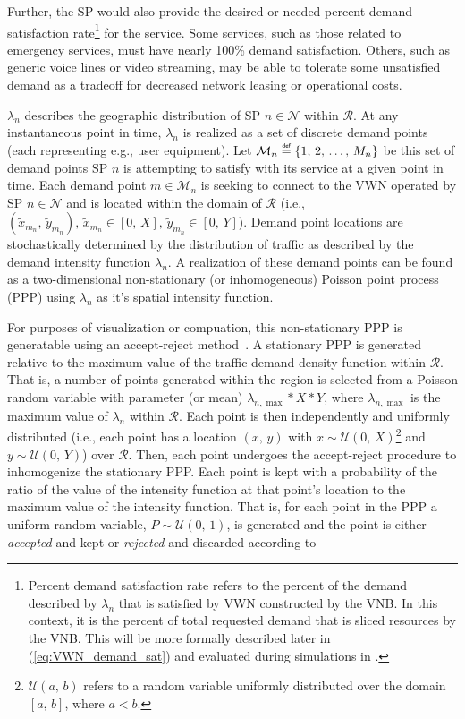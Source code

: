 \documentclass[12pt,dvipsnames]{report}
\newcommand\defeq{\mathrel{\overset{\makebox[0pt]{\mbox{\normalfont\tiny\sffamily def}}}{=}}}
\begin{document}
Further, the SP would also provide the desired or needed percent demand satisfaction rate\footnote{Percent demand satisfaction rate refers to the percent of the demand described by $\lambda_n$ that is satisfied by VWN constructed by the VNB.  In this context, it is the percent of total requested demand that is sliced resources by the VNB.  This will be more formally described later in  (\cref{eq:VWN_demand_sat}) and evaluated during simulations in .} for the service.  Some services, such as those related to emergency services, must have nearly 100\% demand satisfaction.  Others, such as generic voice lines or video streaming, may be able to tolerate some unsatisfied demand as a tradeoff for decreased network leasing or operational costs.

$\lambda_n$ describes the geographic distribution of SP $n \in \mathcal{N}$ within $\mathcal{R}$.  At any instantaneous point in time, $\lambda_n$ is realized as a set of discrete demand points (each representing e.g., user equipment).  Let $\mathcal{M}_n \defeq \left\{1,\, 2,\, \ldots,\, M_n\right\}$ be this set of demand points SP $n$ is attempting to satisfy with its service at a given point in time.  Each demand point $m \in \mathcal{M}_n$ is seeking to connect to the VWN operated by SP $n \in \mathcal{N}$ and is located within the domain of $\mathcal{R}$ (i.e., $\left( \tilde{x}_{m_n},\, \tilde{y}_{m_n} \right),\, \tilde{x}_{m_n} \in \left[ 0,\, X \right],\, \tilde{y}_{m_n} \in \left[ 0,\, Y \right]$).  Demand point locations are stochastically determined by the distribution of traffic as described by the demand intensity function $\lambda_n$.  A realization of these demand points can be found as a two-dimensional non-stationary (or inhomogeneous) Poisson point process (PPP) using $\lambda_n$ as it's spatial intensity function.

For purposes of visualization or compuation, this non-stationary PPP is generatable using an accept-reject method~\cite{leeds:nsPPPgeneration}.  A stationary PPP is generated relative to the maximum value of the traffic demand density function within $\mathcal{R}$.  That is, a number of points generated within the region is selected from a Poisson random variable with parameter (or mean) $\lambda_{n,\max}*X*Y$, where $\lambda_{n,\max}$ is the maximum value of $\lambda_n$ within $\mathcal{R}$.  Each point is then independently and uniformly distributed (i.e., each point has a location $\left( x,\, y \right)$ with $x \sim \mathcal{U}\left( 0,\, X \right)$\footnote{$\mathcal{U}\left( a,\, b \right)$ refers to a random variable uniformly distributed over the domain $\left[ a,\, b \right]$, where $a < b$.} and $y \sim \mathcal{U}\left( 0,\, Y \right)$) over $\mathcal{R}$.  Then, each point undergoes the accept-reject procedure to inhomogenize the stationary PPP.  Each point is kept with a probability of the ratio of the value of the intensity function at that point's location to the maximum value of the intensity function.  That is, for each point in the PPP a uniform random variable, $P \sim \mathcal{U}\left( 0,\, 1 \right)$, is generated and the point is either \emph{accepted} and kept or \emph{rejected} and discarded according to
\end{document}
